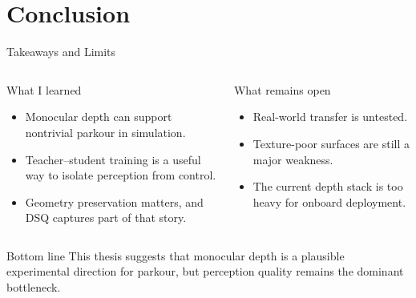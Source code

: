 \documentclass[aspectratio=169,10pt]{beamer}
\begin{document}
\section{Conclusion}

\begin{frame}{Takeaways and Limits}
  \begin{columns}[T,onlytextwidth]
    \begin{block}{What I learned}
      \small
      \begin{itemize}
        \item Monocular depth can support nontrivial parkour \alert{in simulation}.
        \item Teacher--student training is a useful way to isolate perception from control.
        \item Geometry preservation matters, and DSQ captures part of that story.
      \end{itemize}
    \end{block}

    \begin{block}{What remains open}
      \small
      \begin{itemize}
        \item Real-world transfer is untested.
        \item Texture-poor surfaces are still a major weakness.
        \item The current depth stack is too heavy for onboard deployment.
      \end{itemize}
    \end{block}
  \end{columns}

  \vspace{0.4em}
  \begin{alertblock}{Bottom line}
    This thesis suggests that monocular depth is a plausible experimental direction for parkour, but perception quality remains the dominant bottleneck.
  \end{alertblock}
\end{frame}

\end{document}
